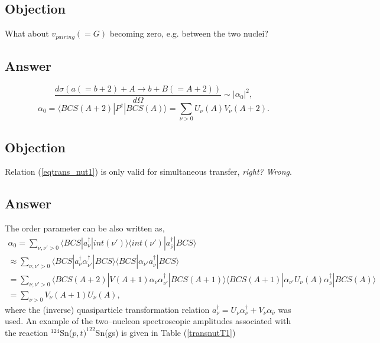 \documentclass[a4paper,11pt]{book}
\numberwithin{equation}{section}
\numberwithin{figure}{section}
\numberwithin{table}{section}
\begin{document}
\begin{subappendices}
\subsection*{Objection}
What about $v_{pairing}(=G)$ becoming zero, e.g. between the two nuclei?
\subsection*{Answer}
\begin{equation}
\frac{d\sigma(a(=b+2)+A\rightarrow b+B(=A+2))}{d\Omega}\sim |\alpha_0|^2,
\end{equation}
\begin{equation}\label{eqtrans_nut1}
\alpha_0=\langle BCS(A+2) |P^\dagger|BCS(A)\rangle=\sum_{\nu>0}U_{\nu}(A)V_{\nu}(A+2).
\end{equation}
\subsection*{Objection}
Relation (\ref{eqtrans_nut1}) is only valid for simultaneous transfer, \textit{right?} \textit{Wrong}.
\subsection*{Answer}
The order parameter can be also written as,
\begin{multline}
\alpha_0=\sum_{\nu,\nu'>0}\langle BCS |a^\dagger_{\nu}|int(\nu')\rangle\langle int(\nu')|a^\dagger_{\bar\nu}|BCS\rangle\\
\approx\sum_{\nu,\nu'>0}\langle BCS |a^\dagger_{\nu}\alpha^\dagger_{\nu'}|BCS\rangle\langle BCS|\alpha_{\nu'}a^\dagger_{\bar\nu}|BCS\rangle \\
=\sum_{\nu,\nu'>0}\langle BCS(A+2) |V(A+1)\alpha_{\bar\nu}\alpha^\dagger_{\nu'}|BCS(A+1)\rangle\langle BCS(A+1)|\alpha_{\nu'}U_\nu(A)\alpha^\dagger_{\bar\nu}|BCS(A)\rangle\\
=\sum_{\nu>0}V_\nu(A+1)U_{\nu}(A),
\end{multline}
where the (inverse) quasiparticle transformation relation $a^{\dagger}_\nu=U_{\nu}\alpha^{\dagger}_{\nu}+V_{\nu}\alpha_{\bar{\nu}}$ was used. An example of the two--nucleon spectroscopic amplitudes associated with the reaction $^{124}$Sn($p,t)^{122}$Sn(gs) is given in Table (\ref{transnutT1})

\end{subappendices}
\end{document}
